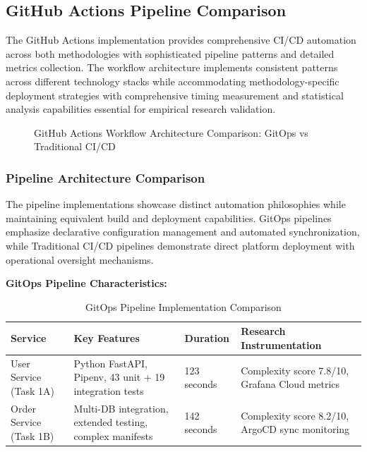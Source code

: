 \subsection{GitHub Actions Pipeline Comparison}

The GitHub Actions implementation provides comprehensive CI/CD automation across both methodologies with sophisticated pipeline patterns and detailed metrics collection. The workflow architecture implements consistent patterns across different technology stacks while accommodating methodology-specific deployment strategies with comprehensive timing measurement and statistical analysis capabilities essential for empirical research validation.

\begin{figure}[H]
\centering
\caption{GitHub Actions Workflow Architecture Comparison: GitOps vs Traditional CI/CD}
\label{fig:github-actions-workflow-comparison}
\end{figure}

\subsubsection{Pipeline Architecture Comparison}

The pipeline implementations showcase distinct automation philosophies while maintaining equivalent build and deployment capabilities. GitOps pipelines emphasize declarative configuration management and automated synchronization, while Traditional CI/CD pipelines demonstrate direct platform deployment with operational oversight mechanisms.

\textbf{GitOps Pipeline Characteristics:}

\begin{table}[H]
\centering
\caption{GitOps Pipeline Implementation Comparison}
\label{tab:gitops-pipeline-comparison}
\begin{tabular}{|p{3cm}|p{4cm}|p{3cm}|p{4cm}|}
\hline
\textbf{Service} & \textbf{Key Features} & \textbf{Duration} & \textbf{Research Instrumentation} \\
\hline
User Service (Task 1A) & Python FastAPI, Pipenv, 43 unit + 19 integration tests & 123 seconds & Complexity score 7.8/10, Grafana Cloud metrics \\
\hline
Order Service (Task 1B) & Multi-DB integration, extended testing, complex manifests & 142 seconds & Complexity score 8.2/10, ArgoCD sync monitoring \\
\hline
\end{tabular}
\end{table}

